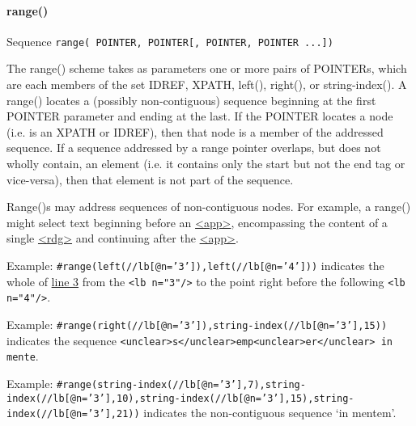 \paragraph[{range()}]{range()}\label{SATSRN}\par
Sequence \texttt{range( POINTER, POINTER[, POINTER, POINTER ...])}\par
The  {\name range()} scheme takes as parameters one or more pairs of POINTERs, which are each members of the set IDREF, XPATH,  {\name left()},  {\name right()}, or  {\name string-index()}. A  {\name range()} locates a (possibly non-contiguous) sequence beginning at the first POINTER parameter and ending at the last. If the POINTER locates a node (i.e. is an XPATH or IDREF), then that node is a member of the addressed sequence. If a sequence addressed by a range pointer overlaps, but does not wholly contain, an element (i.e. it contains only the start but not the end tag or vice-versa), then that element is not part of the sequence.\par
 {\name Range()}s may address sequences of non-contiguous nodes. For example, a range() might select text beginning before an \hyperref[TEI.app]{<app>}, encompassing the content of a single \hyperref[TEI.rdg]{<rdg>} and continuing after the \hyperref[TEI.app]{<app>}.\par
Example: \texttt{\#range(left(//lb[@n='3']),left(//lb[@n='4']))} indicates the whole of \hyperref[SATSXP-ex]{line 3} from the \texttt{<lb n="3"/>} to the point right before the following \texttt{<lb n="4"/>}.\par
Example: \texttt{\#range(right(//lb[@n='3']),string-index(//lb[@n='3'],15))} indicates the sequence \texttt{<unclear>s</unclear>emp<unclear>er</unclear> in mente}.\par
Example: \texttt{\#range(string-index(//lb[@n='3'],7),string-index(//lb[@n='3'],10),string-index(//lb[@n='3'],15),string-index(//lb[@n='3'],21))} indicates the non-contiguous sequence ‘in mentem’.
